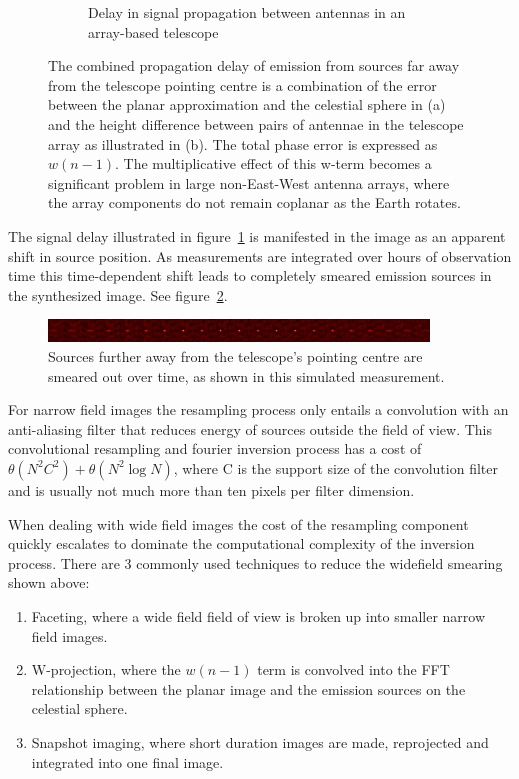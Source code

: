 \documentclass[a4paper,10pt]{article}
\begin{document}
\begin{figure}[h!]
\begin{subfigure}[b]{0.45\textwidth}
    \caption{Delay in signal propagation between antennas in an array-based telescope}
  \end{subfigure}
  \caption[Widefield phase delay]{The combined propagation delay of emission from sources far away from the telescope pointing centre is a combination
  of the error between the planar approximation and the celestial sphere in (a) and the height difference between pairs of antennae
  in the telescope array as illustrated in (b). The total phase error is expressed as $w(n-1)$. The multiplicative effect of this w-term becomes a
  significant problem in large non-East-West antenna arrays, where the array components do not remain coplanar as the Earth rotates.}
  \label{FIG_WIDEFIELD_ERROR}
\end{figure}

The signal delay illustrated in figure~\ref{FIG_WIDEFIELD_ERROR} is manifested in the image as an apparent shift 
in source position. As measurements are integrated over hours of observation time this time-dependent shift leads to completely
smeared emission sources in the synthesized image. See figure~\ref{FIG_SMEARING}.
\begin{figure}[h!]
 \centering
 \includegraphics[width=0.9\textwidth]{images/distortions.png}
 \caption[Wide field distortions]{Sources further away from the telescope's pointing centre are smeared out over time, as
 shown in this simulated measurement.}
 \label{FIG_SMEARING}
\end{figure}

For narrow field images the resampling process only entails a convolution with an anti-aliasing filter that reduces energy of 
sources outside the field of view. This convolutional resampling and fourier inversion process has a cost of 
$\theta(N^2C^2) + \theta(N^2\log{N})$, where C is the support size of the convolution filter and is usually not much more 
than ten pixels per filter dimension.

When dealing with wide field images the cost of the resampling component quickly escalates to dominate the computational
complexity of the inversion process. There are 3 commonly used techniques to reduce the widefield smearing shown above:
\begin{enumerate}
 \item Faceting, where a wide field field of view is broken up into smaller narrow field images.
 \item W-projection, where the $w(n-1)$ term is convolved into the FFT relationship between the planar image and the emission sources
 on the celestial sphere.
 \item Snapshot imaging, where short duration images are made, reprojected and integrated into one final image.
\end{enumerate}
\end{document}
